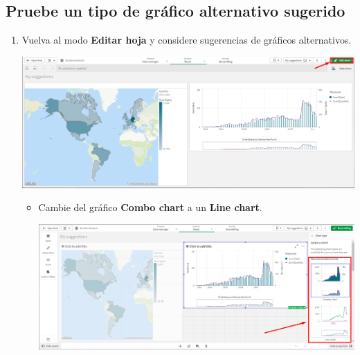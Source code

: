 \documentclass[12pt,letterpaper]{article}
\newcommand\tab[1][1cm]{\hspace*{#1}}
\begin{document}
    \subsection{Pruebe un tipo de gráfico alternativo sugerido}
    \begin{enumerate}[\tab 1.]
        \item Vuelva al modo \textbf{Editar hoja} y considere sugerencias de gráficos alternativos.
        \begin{center}
            \includegraphics[width=13cm]{./img/img23.png}
        \end{center}
        \begin{itemize}
            \item Cambie del gráfico \textbf{Combo chart} a un \textbf{Line chart}.
            \begin{center}
                \includegraphics[width=13cm]{./img/img23.1.png}
            \end{center}
        \end{itemize}
    \end{enumerate}
    
\end{document}
